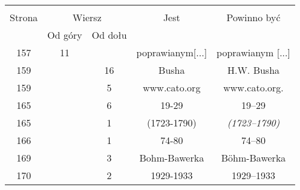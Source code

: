 \documentclass[a4paper,11pt]{article}
\begin{document}
\begin{center}

  \begin{tabular}{|c|c|c|c|c|}
    \hline
    & \multicolumn{2}{c|}{} & & \\
    Strona & \multicolumn{2}{c|}{Wiersz} & Jest
                              & Powinno być \\ \cline{2-3}
    & Od góry & Od dołu & & \\
    \hline
    157 & 11 & & poprawianym[...] & poprawianym [...] \\
    159 & & 16 & Busha & H.W. Busha \\
    159 & &  5 & www.cato.org & www.cato.org. \\
    165 & &  6 & 19-29 & 19--29 \\
    165 & &  1 & (1723-1790) & \emph{(1723--1790)} \\
    166 & &  1 & 74-80 & 74--80 \\
    169 & &  3 & Bohm-Bawerka & B\"{o}hm-Bawerka \\
    170 & &  2 & 1929-1933 & 1929--1933 \\
    \hline
  \end{tabular}






\end{center}
\end{document}
